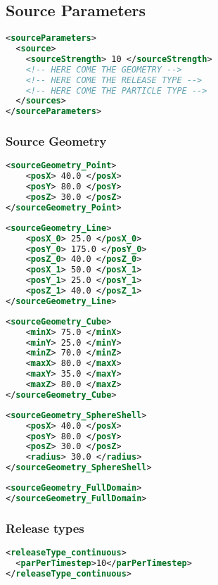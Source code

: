 \subsection{Source Parameters}
\begin{lstlisting}[language=XML]
<sourceParameters>
  <source>
    <sourceStrength> 10 </sourceStrength>
    <!-- HERE COME THE GEOMETRY -->
    <!-- HERE COME THE RELEASE TYPE -->
    <!-- HERE COME THE PARTICLE TYPE -->
  </sources>
</sourceParameters>
\end{lstlisting}

\subsubsection{Source Geometry}
\begin{lstlisting}[language=XML]
<sourceGeometry_Point>
    <posX> 40.0 </posX>
    <posY> 80.0 </posY>
    <posZ> 30.0 </posZ>
</sourceGeometry_Point>
\end{lstlisting}

\begin{lstlisting}[language=XML]
<sourceGeometry_Line>
    <posX_0> 25.0 </posX_0>
    <posY_0> 175.0 </posY_0>
    <posZ_0> 40.0 </posZ_0>
    <posX_1> 50.0 </posX_1>
    <posY_1> 25.0 </posY_1>
    <posZ_1> 40.0 </posZ_1>
</sourceGeometry_Line>
\end{lstlisting}

\begin{lstlisting}[language=XML]
<sourceGeometry_Cube>
    <minX> 75.0 </minX>
    <minY> 25.0 </minY>
    <minZ> 70.0 </minZ>
    <maxX> 80.0 </maxX>
    <maxY> 35.0 </maxY>
    <maxZ> 80.0 </maxZ>
</sourceGeometry_Cube>
\end{lstlisting}

\begin{lstlisting}[language=XML]
<sourceGeometry_SphereShell>
    <posX> 40.0 </posX>
    <posY> 80.0 </posY>
    <posZ> 30.0 </posZ>
    <radius> 30.0 </radius>
</sourceGeometry_SphereShell>
\end{lstlisting}

\begin{lstlisting}[language=XML]
<sourceGeometry_FullDomain>
</sourceGeometry_FullDomain>
\end{lstlisting}

\subsubsection{Release types}
\begin{lstlisting}[language=XML]
<releaseType_continuous>
  <parPerTimestep>10</parPerTimestep>
</releaseType_continuous>
\end{lstlisting}

